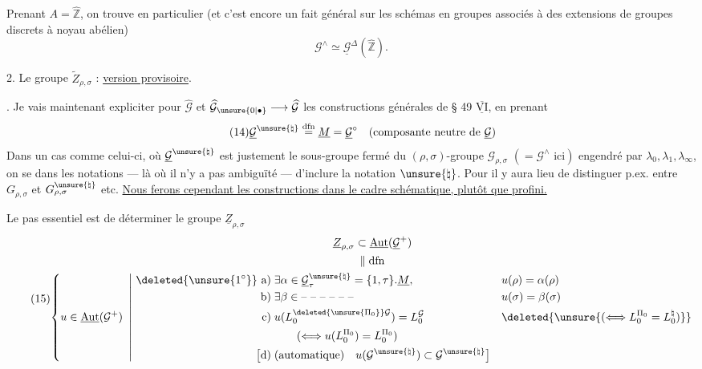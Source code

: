 Prenant $A=\widehat{\mathbb Z}$, on trouve en particulier (et c'est encore un fait général sur les schémas en groupes associés à des extensions de groupes discrets à noyau abélien)
\[
\tag{13}
\mathcal G^{\wedge}\simeq\underline{\mathcal G}^{\Delta}(\widehat{\mathbb Z}).
\]

2. Le groupe $\widetilde Z_{\rho,\sigma}$ : \uline{version provisoire}.

. Je vais maintenant expliciter pour $\widehat{\mathcal G}$ et $\widehat{\mathcal G}_{\unsure{0|\bullet}}\longrightarrow\widehat{\mathcal G}$ les constructions générales de § 49 $\overline{\underline{\mathrm{VI}}}$, en  prenant 
\[
\tag{14}
\underline{\mathcal G}^{\unsure{\natural}}\overset{\mathrm{dfn}}=
\underline M=\underline{\mathcal G}^{\circ}
\quad(\text{composante neutre de }\underline{\mathcal G})
\]
Dans un cas comme celui-ci, où $\underline{\mathcal G}^{\unsure{\natural}}$ est justement le sous-groupe fermé du $(\rho,\sigma)$-groupe $\mathcal G_{\rho,\sigma}$ $(=\mathcal G^{\wedge}\text{ ici})$ engendré par $\lambda_0,\lambda_1,\lambda_\infty$, on se  dans les notations --- là où il n'y a pas ambiguïté --- d'inclure la notation $\unsure{\natural}$. Pour  il y aura lieu de distinguer p.ex. entre $G_{\rho,\sigma}$ et $G_{\rho,\sigma}^{\unsure{\natural}}$ etc. \uline{Nous ferons cependant les constructions dans le cadre schématique, plutôt que profini.}


Le pas essentiel est de déterminer le groupe $\underline Z_{\rho,\sigma}$
\[
\tag{15}
\begin{gathered}
\underline Z_{\rho,\sigma}\subset\underline{\operatorname{Aut}}(\underline{\mathcal G}^{+})\\
\Vert\;\mathrm{dfn}\\
\left\{u\in\underline{\operatorname{Aut}}(\mathcal G^{+})\ \left|\
\begin{aligned}
\deleted{\unsure{1^{\circ}}}\ \text{a)}\;&\exists\alpha\in\underline{\mathcal G}_{\tau}^{\unsure{\natural}}=\{1,\tau\}.\underline M,
&&u(\rho)=\alpha(\rho)\\
\text{b)}\;&\exists\beta\in\text{-- -- -- -- -- --}
&&u(\sigma)=\beta(\sigma)\\
\text{c)}\;&u(L_0^{\deleted{\unsure{\Pi_0}}\mathcal G})=L_0^{\mathcal G}
&&\deleted{\unsure{(\Longleftrightarrow L_0^{\Pi_0}=L_0^{\natural})}}\\
&\qquad(\Longleftrightarrow u(L_0^{\Pi_0})=L_0^{\Pi_0})\\
\bigl[\text{d)}\;&(\text{automatique})\quad u(\mathcal G^{\unsure{\natural}})\subset\mathcal G^{\unsure{\natural}}\bigr]
\end{aligned}\right.\right.
\end{gathered}
\]

